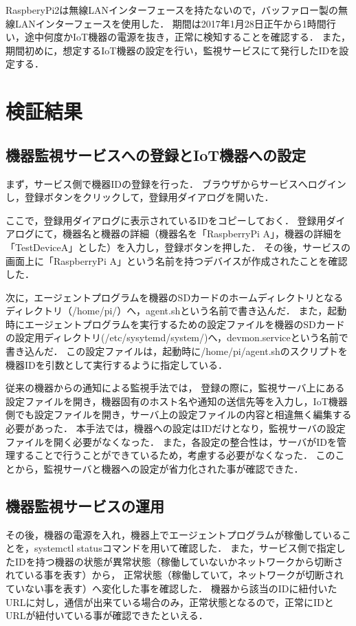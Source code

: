 RaspberyPi2は無線LANインターフェースを持たないので，バッファロー製の無線LANインターフェースを使用した．
期間は2017年1月28日正午から1時間行い，途中何度かIoT機器の電源を抜き，正常に検知することを確認する．
また，期間初めに，想定するIoT機器の設定を行い，監視サービスにて発行したIDを設定する．

\section{検証結果}
\subsection{機器監視サービスへの登録とIoT機器への設定}
まず，サービス側で機器IDの登録を行った．
ブラウザからサービスへログインし，登録ボタンをクリックして，登録用ダイアログを開いた．

ここで，登録用ダイアログに表示されているIDをコピーしておく．
登録用ダイアログにて，機器名と機器の詳細（機器名を「RaspberryPi A」，機器の詳細を「TestDeviceA」とした）を入力し，登録ボタンを押した．
その後，サービスの画面上に「RaspberryPi A」という名前を持つデバイスが作成されたことを確認した．
\medskip

次に，エージェントプログラムを機器のSDカードのホームディレクトリとなるディレクトリ（/home/pi/）へ，agent.shという名前で書き込んだ．
また，起動時にエージェントプログラムを実行するための設定ファイルを機器のSDカードの設定用ディレクトリ(/etc/sysytemd/system/)へ，devmon.serviceという名前で書き込んだ．
この設定ファイルは，起動時に/home/pi/agent.shのスクリプトを機器IDを引数として実行するように指定している．
\medskip

従来の機器からの通知による監視手法では，
登録の際に，監視サーバ上にある設定ファイルを開き，機器固有のホスト名や通知の送信先等を入力し，IoT機器側でも設定ファイルを開き，サーバ上の設定ファイルの内容と相違無く編集する必要があった．
本手法では，機器への設定はIDだけとなり，監視サーバの設定ファイルを開く必要がなくなった．
また，各設定の整合性は，サーバがIDを管理することで行うことができているため，考慮する必要がなくなった．
このことから，監視サーバと機器への設定が省力化された事が確認できた．

\subsection{機器監視サービスの運用}
その後，機器の電源を入れ，機器上でエージェントプログラムが稼働していることを，systemctl statusコマンドを用いて確認した．
また，サービス側で指定したIDを持つ機器の状態が異常状態（稼働していないかネットワークから切断されている事を表す）から，
正常状態（稼働していて，ネットワークが切断されていない事を表す）へ変化した事を確認した．
機器から該当のIDに紐付いたURLに対し，通信が出来ている場合のみ，正常状態となるので，正常にIDとURLが紐付いている事が確認できたといえる．

